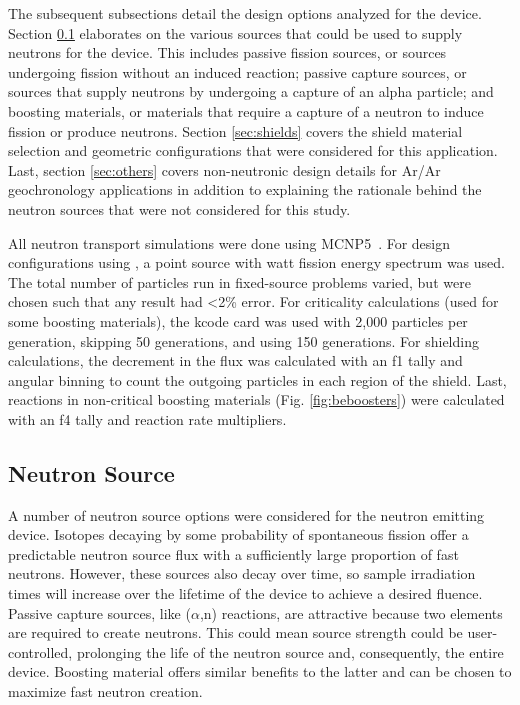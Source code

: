 \documentclass{mc2015}
\begin{document}
The subsequent subsections detail the design options analyzed for the device. Section \ref{sec:sources} elaborates on the various sources that could be used to supply neutrons for the device. This includes passive fission sources, or sources undergoing fission without an induced reaction; passive capture sources, or sources that supply neutrons by undergoing a capture of an alpha particle; and boosting materials, or materials that require a capture of a neutron to induce fission or produce neutrons. Section \ref{sec:shields} covers the shield material selection and geometric configurations that were considered for this application. Last, section \ref{sec:others} covers non-neutronic design details for Ar/Ar geochronology applications in addition to explaining the rationale behind the neutron sources that were not considered for this study. 

All neutron transport simulations were done using MCNP5~\cite{brown_mcnp_2002}. For design configurations using , a point source with watt fission energy spectrum was used. The total number of particles run in fixed-source problems varied, but were chosen such that any result had <2\% error. For criticality calculations (used for some boosting materials), the kcode card was used with 2,000 particles per generation, skipping 50 generations, and using 150 generations. For shielding calculations, the decrement in the flux was calculated with an f1 tally and angular binning to count the outgoing particles in each region of the shield.
 Last, reactions in non-critical boosting materials (Fig. \ref{fig:beboosters}) were calculated with an f4 tally and reaction rate multipliers.

\subsection{Neutron Source}
\label{sec:sources}

A number of neutron source options were considered for the neutron emitting device. Isotopes decaying by some probability of spontaneous fission offer a predictable neutron source flux with a sufficiently large proportion of fast neutrons. However, these sources also decay over time, so sample irradiation times will increase over the lifetime of the device to achieve a desired fluence. Passive capture sources, like ($\alpha$,n) reactions, are attractive because two elements are required to create neutrons. This could mean source strength could be user-controlled, prolonging the life of the neutron source and, consequently, the entire device. Boosting material offers similar benefits to the latter and can be chosen to maximize fast neutron creation.  \\
\end{document}
